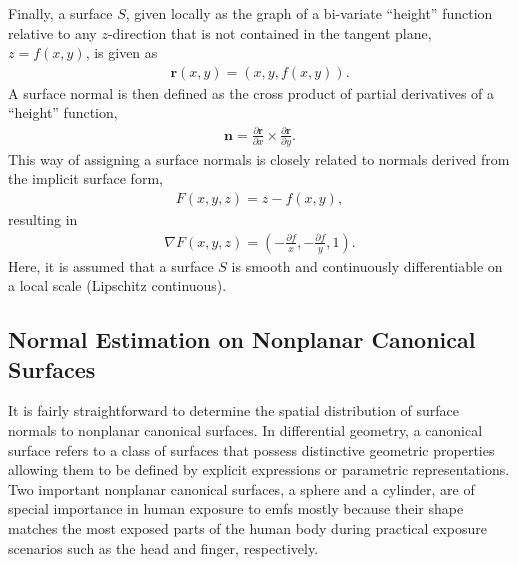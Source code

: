Finally, a surface $S$, given locally as the graph of a bi-variate ``height'' function relative to any $z$-direction that is not contained in the tangent plane, $z = f(x, y)$, is given as
\begin{align}
    \mathbf{r}(x, y) = \left( x, y, f \left( x, y \right) \right).
\end{align}
A surface normal is then defined as the cross product of partial derivatives of a ``height'' function,
\begin{align}
    \mathbf{n} = \frac{\partial \mathbf{r}}{\partial x} \times \frac{\partial \mathbf{r}}{\partial y}.
\end{align}
This way of assigning a surface normals is closely related to normals derived from the implicit surface form,
\begin{align}
    F(x, y, z) = z - f(x, y),
\end{align}
resulting in
\begin{align}
    \nabla F(x, y, z) = \left( -\frac{\partial f}{x}, -\frac{\partial f}{y}, 1 \right).
\end{align}
Here, it is assumed that a surface $S$ is smooth and continuously differentiable on a local scale (Lipschitz continuous).

\subsection{Normal Estimation on Nonplanar Canonical Surfaces}
It is fairly straightforward to determine the spatial distribution of surface normals to nonplanar canonical surfaces.
In differential geometry, a canonical surface refers to a class of surfaces that possess distinctive geometric properties allowing them to be defined by explicit expressions or parametric representations.
Two important nonplanar canonical surfaces, a sphere and a cylinder, are of special importance in human exposure to \gls{emf}s mostly because their shape matches the most exposed parts of the human body during practical exposure scenarios such as the head and finger, respectively.

